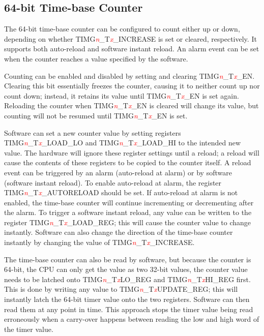 \documentclass[main\_\_EN.tex]{subfiles}
\begin{document}
\subsection{64-bit Time-base Counter}
The 64-bit time-base counter can be configured to count either up or down, depending on whether TIMG\textcolor{red}{\it{n}}\_T\textcolor{red}{\it{x}}\_INCREASE is set or cleared, respectively. It supports both auto-reload and software instant reload. An alarm event can be set when the counter reaches a value specified by the software.

Counting can be enabled and disabled by setting and clearing TIMG\textcolor{red}{\it{n}}\_T\textcolor{red}{\it{x}}\_EN. Clearing this bit essentially freezes the counter, causing it to neither count up nor count down; instead, it retains its value until TIMG\textcolor{red}{\it{n}}\_T\textcolor{red}{\it{x}}\_EN is set again. Reloading the counter when TIMG\textcolor{red}{\it{n}}\_T\textcolor{red}{\it{x}}\_EN is cleared will change its value, but counting will not be resumed until TIMG\textcolor{red}{\it{n}}\_T\textcolor{red}{\it{x}}\_EN is set.

Software can set a new counter value by setting registers TIMG\textcolor{red}{\it{n}}\_T\textcolor{red}{\it{x}}\_LOAD\_LO and TIMG\textcolor{red}{\it{n}}\_T\textcolor{red}{\it{x}}\_LOAD\_HI to the intended new value. The hardware will ignore these register settings until a reload; a reload will cause the contents of these registers to be copied to the counter itself. A reload event can be triggered by an alarm (auto-reload at alarm) or by software (software instant reload). To enable auto-reload at alarm, the register TIMG\textcolor{red}{\it{n}}\_T\textcolor{red}{\it{x}}\_AUTORELOAD should be set. If auto-reload at alarm is not enabled, the time-base counter will continue incrementing or decrementing after the alarm. To trigger a software instant reload, any value can be written to the register TIMG\textcolor{red}{\it{n}}\_T\textcolor{red}{\it{x}}\_LOAD\_REG; this will cause the counter value to change instantly. Software can also change the direction of the time-base counter instantly by changing the value of TIMG\textcolor{red}{\it{n}}\_T\textcolor{red}{\it{x}}\_INCREASE.

The time-base counter can also be read by software, but because the counter is 64-bit, the CPU can only get the value as two 32-bit values, the counter value needs to be latched onto TIMG\textcolor{red}{\it{n}}\_T\textcolor{red}{\it{x}}LO\_REG and TIMG\textcolor{red}{\it{n}}\_T\textcolor{red}{\it{x}}HI\_REG first. This is done by writing any value to TIMG\textcolor{red}{\it{n}}\_T\textcolor{red}{\it{x}}UPDATE\_REG; this will instantly latch the 64-bit timer value onto the two registers. Software can then read them at any point in time. This approach stops the timer value being read erroneously when a carry-over happens between reading the low and high word of the timer value.
\end{document}
